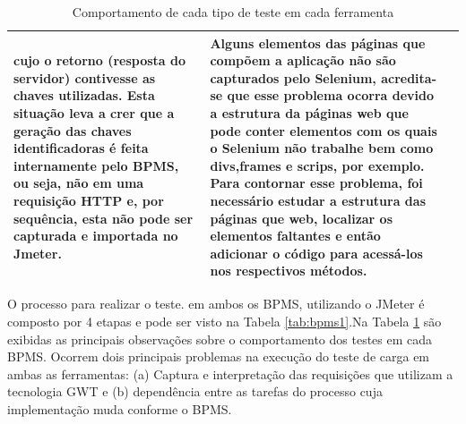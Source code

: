 \documentclass[12pt]{article}
\begin{document}
\begin{table}
{\begin{tabular}{|p{2cm}|p{7cm}|p{7cm}|}
cujo o retorno (resposta do servidor) contivesse as chaves utilizadas. Esta situação leva a crer
que a geração das chaves identificadoras é feita internamente pelo BPMS, ou seja, não em uma
requisição HTTP e, por sequência, esta não pode ser capturada e importada no Jmeter. & 
Alguns elementos das páginas que compõem a aplicação não são capturados pelo Selenium, acredita-se que esse problema ocorra devido a estrutura da páginas web que pode conter elementos com os quais o Selenium não trabalhe bem como divs,frames e
scrips, por exemplo. Para contornar esse problema, foi necessário estudar a estrutura das páginas que web, localizar os elementos faltantes e então adicionar o código para acessá-los nos respectivos métodos.\\\hline
\end{tabular}
}
\caption{Comportamento de cada tipo de teste em cada ferramenta}
\label{tab:bpms2}
\end{table}

       
O processo para realizar o teste. em ambos os BPMS, utilizando o JMeter é composto por 4 etapas e pode ser visto na Tabela \ref{tab:bpms1}.Na Tabela \ref{tab:bpms2} são exibidas as principais observações sobre o comportamento dos testes em cada BPMS. Ocorrem dois principais problemas na execução do teste de carga em ambas as ferramentas: (a) Captura e interpretação das requisições que utilizam a tecnologia GWT e (b) dependência entre as tarefas do processo cuja implementação muda conforme o BPMS. 
\end{document}
